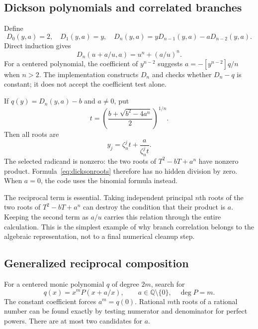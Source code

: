 \documentclass[11pt]{article}
\theoremstyle{definition}\newtheorem{definition}[theorem]{Definition}
\theoremstyle{remark}\newtheorem{remark}[theorem]{Remark}
\newcommand{\Q}{\mathbb Q}\newcommand{\C}{\mathbb C}\newcommand{\Z}{\mathbb Z}
\begin{document}
\subsection{Dickson polynomials and correlated branches}

Define
\begin{equation}
 D_0(y,a)=2,\quad D_1(y,a)=y,\quad
 D_n(y,a)=yD_{n-1}(y,a)-aD_{n-2}(y,a).
\end{equation}
Direct induction gives
\begin{equation}\label{eq:dickson}
 D_n(u+a/u,a)=u^n+(a/u)^n.
\end{equation}
For a centered polynomial, the coefficient of $y^{n-2}$ suggests
$a=-[y^{n-2}]q/n$ when $n>2$. The implementation constructs $D_n$ and checks
whether $D_n-q$ is constant; it does not accept the coefficient test alone.

If $q(y)=D_n(y,a)-b$ and $a\ne0$, put
\begin{equation}\label{eq:dicksont}
 t=\left(\frac{b+\sqrt{b^2-4a^n}}2\right)^{1/n}.
\end{equation}
Then all roots are
\begin{equation}\label{eq:dicksonroots}
 y_j=\zeta_n^j t+\frac{a}{\zeta_n^j t}.
\end{equation}
The selected radicand is nonzero: the two roots of
$T^2-bT+a^n$ have nonzero product. Formula~\eqref{eq:dicksonroots} therefore has
no hidden division by zero. When $a=0$, the code uses the binomial formula
instead.

The reciprocal term is essential. Taking independent principal $n$th roots of
the two roots of $T^2-bT+a^n$ can destroy the condition that their product is
$a$. Keeping the second term as $a/u$ carries this relation through the entire
calculation. This is the simplest example of why branch correlation belongs to
the algebraic representation, not to a final numerical cleanup step.

\subsection{Generalized reciprocal composition}

For a centered monic polynomial $q$ of degree $2m$, search for
\begin{equation}\label{eq:reciprocal}
 q(x)=x^m P(x+a/x),\qquad a\in\Q\setminus\{0\},\quad\deg P=m.
\end{equation}
The constant coefficient forces $a^m=q(0)$. Rational $m$th roots of a rational
number can be found exactly by testing numerator and denominator for perfect
powers. There are at most two candidates for $a$.
\end{document}
